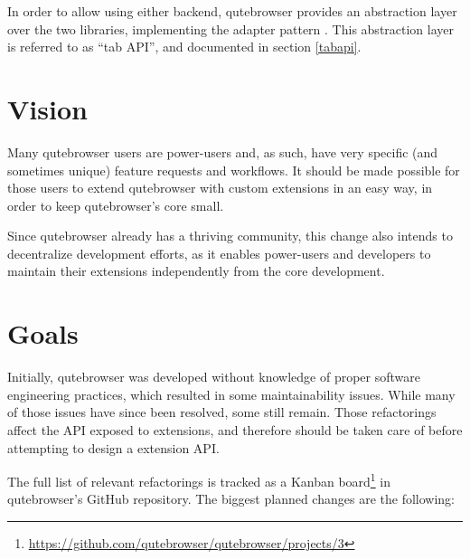 \documentclass[a4paper,parskip=full]{scrreprt}
\begin{document}
In order to allow using either backend, qutebrowser provides an abstraction
layer over the two libraries, implementing the adapter pattern
\autocite[139ff]{gof}. This abstraction layer is referred to as ``tab API'', and
documented in section \ref{tabapi}.

\section{Vision}
\label{vision}

Many qutebrowser users are power-users and, as such, have very specific (and
sometimes unique) feature requests and workflows. It should be made possible for
those users to extend qutebrowser with custom extensions in an easy way, in order
to keep qutebrowser's core small.

Since qutebrowser already has a thriving community, this change also intends to
decentralize development efforts, as it enables power-users and
developers to maintain their extensions independently from the core development.

\section{Goals}
\label{goals}

Initially, qutebrowser was developed without knowledge of proper software
engineering practices, which resulted in some maintainability issues. While many
of those issues have since been resolved, some still remain. Those
refactorings affect the API exposed to extensions, and therefore should be taken
care of before attempting to design a extension API.

The full list of relevant refactorings is tracked as a Kanban
board\footnote{\url{https://github.com/qutebrowser/qutebrowser/projects/3}} in
qutebrowser's GitHub repository. The biggest planned changes are the following:
\end{document}
